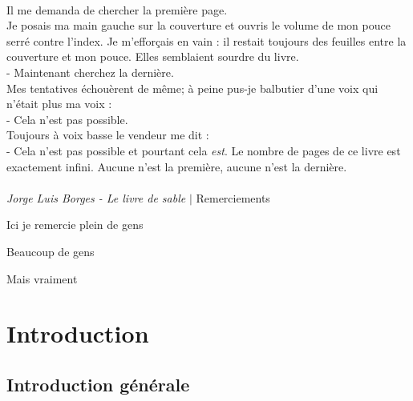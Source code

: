 \documentclass[symmetric,justified,marginals=raggedouter]{tufte-book}
\begin{document}
\thispagestyle{empty}%
\clearpage%


\newpage

~\vfill
\noindent
\par\noindent Il me demanda de chercher la première page.\\
\noindent Je posais ma main gauche sur la couverture et ouvris le volume de mon pouce serré contre l'index. Je m'efforçais en vain : il restait toujours des feuilles entre la couverture et mon pouce. Elles semblaient sourdre du livre.\\
- Maintenant cherchez la dernière.\\
\noindent Mes tentatives échouèrent de même; à peine pus-je balbutier d'une voix qui n'était plus ma voix :\\
- Cela n'est pas possible.\\
\noindent Toujours à voix basse le vendeur me dit : \\
- Cela n'est pas possible et pourtant cela \textit{est}. Le nombre de pages de ce livre est exactement infini. Aucune n'est la première, aucune n'est la dernière.
\\~\\
\noindent\textit{Jorge Luis Borges - Le livre de sable} 
\vfill
\indent
\newpage
\begingroup
\vspace*{8em}
\huge $\vert$ \huge Remerciements
\vspace*{4em}
\par\normalsize Ici je remercie plein de gens

\par Beaucoup de gens

\par Mais vraiment
\endgroup
\vfill


\tableofcontents

\listoffigures

\listoftables

\mainmatter


\chapter{Introduction}

\section{Introduction générale}
\end{document}
